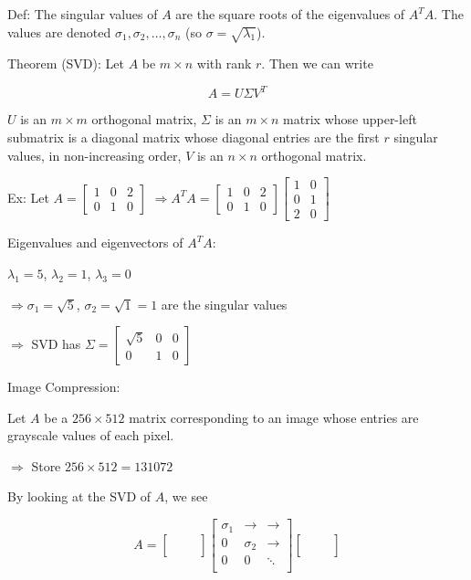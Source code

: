 \documentclass{article}
\begin{document}
Def: The singular values of $A$ are the square roots of the eigenvalues of $A^TA$. The values are denoted $\sigma_1, \sigma_2, \ldots, \sigma_n$ (so $\sigma = \sqrt{\lambda_1}$).

Theorem (SVD): Let $A$ be $m \times n$ with rank $r$. Then we can write

\[A = U\Sigma V^T\]

$U$ is an $m \times m$ orthogonal matrix,
$\Sigma$ is an $m \times n$ matrix whose upper-left submatrix is a diagonal matrix whose diagonal entries are the first $r$ singular values, in non-increasing order,
$V$ is an $n \times n$ orthogonal matrix.

Ex: Let $A = \begin{bmatrix} 1 & 0 & 2 \\ 0 & 1 & 0 \end{bmatrix}$ $\Rightarrow A^TA = \begin{bmatrix} 1 & 0 & 2 \\ 0 & 1 & 0 \end{bmatrix}\begin{bmatrix} 1 & 0 \\ 0 & 1 \\ 2 & 0 \end{bmatrix}$

Eigenvalues and eigenvectors of $A^TA$:

$\lambda_1 = 5$, $\lambda_2 = 1$, $\lambda_3 = 0$

$\Rightarrow \sigma_1 = \sqrt{5}$, $\sigma_2 = \sqrt{1} = 1$ are the singular values

$\Rightarrow$ SVD has $\Sigma = \begin{bmatrix} \sqrt{5} & 0 & 0 \\ 0 & 1 & 0 \end{bmatrix}$

Image Compression:

Let $A$ be a $256 \times 512$ matrix corresponding to an image whose entries are grayscale values of each pixel.

$\Rightarrow$ Store $256 \times 512 = 131072$

By looking at the SVD of $A$, we see 

\[A = \begin{bmatrix} & &  \\ & & \\ & & \\ \end{bmatrix}\begin{bmatrix} \sigma_1 & \rightarrow & \rightarrow \\ 0 & \sigma_2 & \rightarrow \\ 0 & 0 & \ddots \\ \end{bmatrix} \begin{bmatrix} & &  \\ & & \\ & & \\ \end{bmatrix}\]
\end{document}

